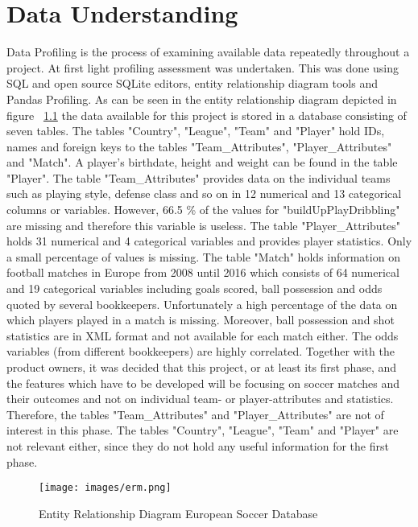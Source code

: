 
\chapter{Data Understanding}
\label{chap:data_understanding}

Data Profiling is the process of examining available data repeatedly throughout a project. At first light profiling assessment was undertaken. This was done using SQL and open source SQLite editors, entity relationship diagram tools and Pandas Profiling. As can be seen in the entity relationship diagram depicted in figure ~\ref{fig:erm} the data available for this project is stored in a database consisting of seven tables.
\newline
The tables "Country", "League", "Team" and "Player" hold IDs, names and foreign keys to the tables "Team\_Attributes", "Player\_Attributes" and "Match". A player's birthdate, height and weight can be found in the table "Player".
\newline
The table "Team\_Attributes" provides data on the individual teams such as playing style, defense class and so on in 12 numerical and 13 categorical columns or variables. However, 66.5 \% of the values for "buildUpPlayDribbling" are missing and therefore this variable is useless.
\newline
The table "Player\_Attributes" holds 31 numerical and 4 categorical variables and provides player statistics. Only a small percentage of values is missing.
\newline
The table "Match" holds information on football matches in Europe from 2008 until 2016 which consists of 64 numerical and 19 categorical variables including goals scored, ball possession and odds quoted by several bookkeepers. Unfortunately a high percentage of the data on which players played in a match is missing. Moreover, ball possession and shot statistics are in XML format and not available for each match either. The odds variables (from different bookkeepers) are highly correlated.   
\newline
Together with the product owners, it was decided that this project, or at least its first phase, and the features which have to be developed will be focusing on soccer matches and their outcomes and not on individual team- or player-attributes and statistics. Therefore, the tables "Team\_Attributes" and "Player\_Attributes" are not of interest in this phase. The tables "Country", "League", "Team" and "Player" are not relevant either, since they do not hold any useful information for the first phase.


\begin{figure}[H]
\centering
\texttt{[image: images/erm.png]}
\caption{Entity Relationship Diagram European Soccer Database}
\label{fig:erm}
\end{figure}